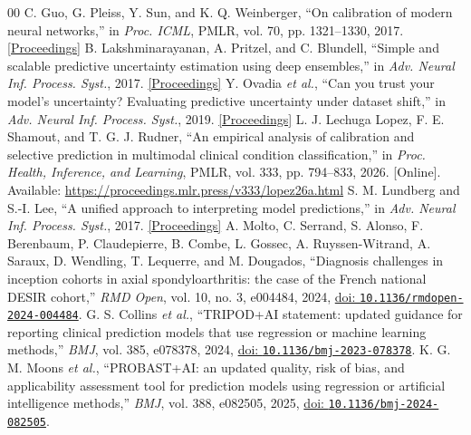 \documentclass[conference]{IEEEtran}
\newcommand{\doi}[1]{\href{https://doi.org/#1}{doi: \nolinkurl{#1}}}
\begin{document}
\begin{thebibliography}{00}
 C. Guo, G. Pleiss, Y. Sun, and K. Q. Weinberger, ``On calibration of modern neural networks,'' in \emph{Proc. ICML}, PMLR, vol. 70, pp. 1321--1330, 2017. \href{https://proceedings.mlr.press/v70/guo17a.html}{[Proceedings]}
 B. Lakshminarayanan, A. Pritzel, and C. Blundell, ``Simple and scalable predictive uncertainty estimation using deep ensembles,'' in \emph{Adv. Neural Inf. Process. Syst.}, 2017. \href{https://proceedings.neurips.cc/paper/2017/hash/9ef2ed4b7fd2c810847ffa5fa85bce38-Abstract.html}{[Proceedings]}
 Y. Ovadia \emph{et al.}, ``Can you trust your model's uncertainty? Evaluating predictive uncertainty under dataset shift,'' in \emph{Adv. Neural Inf. Process. Syst.}, 2019. \href{https://proceedings.neurips.cc/paper/2019/hash/8558cb408c1d76621371888657d2eb1d-Abstract.html}{[Proceedings]}
 L. J. Lechuga Lopez, F. E. Shamout, and T. G. J. Rudner, ``An empirical analysis of calibration and selective prediction in multimodal clinical condition classification,'' in \emph{Proc. Health, Inference, and Learning}, PMLR, vol. 333, pp. 794--833, 2026. [Online]. Available: \url{https://proceedings.mlr.press/v333/lopez26a.html}
 S. M. Lundberg and S.-I. Lee, ``A unified approach to interpreting model predictions,'' in \emph{Adv. Neural Inf. Process. Syst.}, 2017. \href{https://proceedings.neurips.cc/paper/2017/hash/8a20a8621978632d76c43dfd28b67767-Abstract.html}{[Proceedings]}
 A. Molto, C. Serrand, S. Alonso, F. Berenbaum, P. Claudepierre, B. Combe, L. Gossec, A. Ruyssen-Witrand, A. Saraux, D. Wendling, T. Lequerre, and M. Dougados, ``Diagnosis challenges in inception cohorts in axial spondyloarthritis: the case of the French national DESIR cohort,'' \emph{RMD Open}, vol. 10, no. 3, e004484, 2024, \doi{10.1136/rmdopen-2024-004484}.
 G. S. Collins \emph{et al.}, ``TRIPOD+AI statement: updated guidance for reporting clinical prediction models that use regression or machine learning methods,'' \emph{BMJ}, vol. 385, e078378, 2024, \doi{10.1136/bmj-2023-078378}.
 K. G. M. Moons \emph{et al.}, ``PROBAST+AI: an updated quality, risk of bias, and applicability assessment tool for prediction models using regression or artificial intelligence methods,'' \emph{BMJ}, vol. 388, e082505, 2025, \doi{10.1136/bmj-2024-082505}.
\end{thebibliography}
\end{document}
